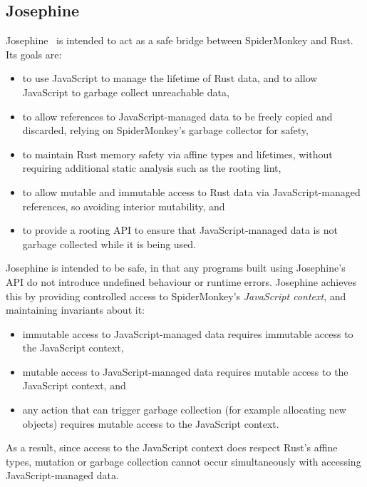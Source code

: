 \subsection{Josephine}

Josephine~\cite{josephine} is intended to act as a safe bridge between
SpiderMonkey and Rust. Its goals are:
\begin{itemize}

\item to use JavaScript to manage the lifetime of Rust data,
  and to allow JavaScript to garbage collect unreachable data,

\item to allow references to JavaScript-managed data to be freely copied and discarded,
  relying on SpiderMonkey's garbage collector for safety,

\item to maintain Rust memory safety via affine types and lifetimes,
  without requiring additional static analysis such as the rooting lint,

\item to allow mutable and immutable access to Rust data via JavaScript-managed references,
  so avoiding interior mutability, and

\item to provide a rooting API to ensure that JavaScript-managed data is not garbage collected
  while it is being used.

\end{itemize}
Josephine is intended to be safe, in that any programs built using Josephine's API
do not introduce undefined behaviour or runtime errors.
Josephine achieves this by providing controlled access to
SpiderMonkey's \emph{JavaScript context}, and maintaining invariants about it:
\begin{itemize}

\item immutable access to JavaScript-managed data requires immutable access
  to the JavaScript context,

\item mutable access to JavaScript-managed data requires mutable access
  to the JavaScript context, and

\item any action that can trigger garbage collection (for example allocating
  new objects) requires mutable access to the JavaScript context.

\end{itemize}
As a result, since access to the JavaScript context does respect
Rust's affine types, mutation or garbage collection cannot occur
simultaneously with accessing JavaScript-managed data.

